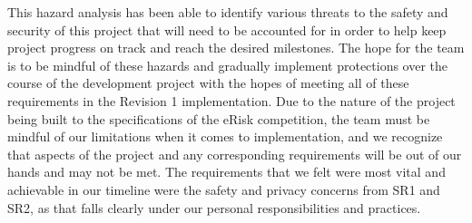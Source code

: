 \documentclass{article}
\begin{document}
This hazard analysis has been able to identify various threats to the safety and security of this project that will need to be accounted for in order to help keep project progress on track and reach the desired milestones. The hope for the team is to be mindful of these hazards and gradually implement protections over the course of the development project with the hopes of meeting all of these requirements in the Revision 1 implementation. Due to the nature of the project being built to the specifications of the eRisk competition, the team must be mindful of our limitations when it comes to implementation, and we recognize that aspects of the project and any corresponding requirements will be out of our hands and may not be met. The requirements that we felt were most vital and achievable in our timeline were the safety and privacy concerns from SR1 and SR2, as that falls clearly under our personal responsibilities and practices.
\end{document}
